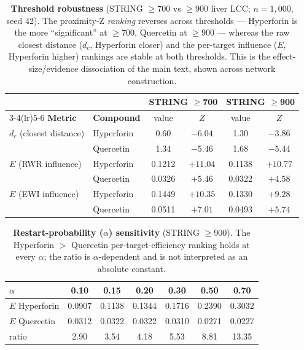 \begin{table}[ht]
\centering
\caption{\textbf{Threshold robustness} (STRING $\geq$700 vs $\geq$900 liver LCC; $n=1{,}000$, seed 42). The proximity-Z \emph{ranking} reverses across thresholds --- Hyperforin is the more ``significant'' at $\geq$700, Quercetin at $\geq$900 --- whereas the raw closest distance ($d_c$, Hyperforin closer) and the per-target influence ($E$, Hyperforin higher) rankings are stable at both thresholds. This is the effect-size/evidence dissociation of the main text, shown across network construction.}
\label{tab:s_threshold}
\begin{tabular}{@{}llcccc@{}}
\toprule
& & \multicolumn{2}{c}{\textbf{STRING $\geq$700}} & \multicolumn{2}{c}{\textbf{STRING $\geq$900}} \\
\cmidrule(lr){3-4}\cmidrule(lr){5-6}
\textbf{Metric} & \textbf{Compound} & value & $Z$ & value & $Z$ \\
\midrule
$d_c$ (closest distance) & Hyperforin & 0.60 & $-6.04$ & 1.30 & $-3.86$ \\
                         & Quercetin  & 1.34 & $-5.46$ & 1.68 & $-5.44$ \\
\addlinespace
$E$ (RWR influence)      & Hyperforin & 0.1212 & $+11.04$ & 0.1138 & $+10.77$ \\
                         & Quercetin  & 0.0326 & $+5.46$  & 0.0322 & $+4.58$ \\
\addlinespace
$E$ (EWI influence)      & Hyperforin & 0.1449 & $+10.35$ & 0.1330 & $+9.28$ \\
                         & Quercetin  & 0.0511 & $+7.01$  & 0.0493 & $+5.74$ \\
\bottomrule
\end{tabular}
\end{table}

\begin{table}[ht]
\centering
\caption{\textbf{Restart-probability ($\alpha$) sensitivity} (STRING $\geq$900). The Hyperforin $>$ Quercetin per-target-efficiency ranking holds at every $\alpha$; the ratio is $\alpha$-dependent and is not interpreted as an absolute constant.}
\label{tab:s_alpha}
\begin{tabular}{@{}lcccccc@{}}
\toprule
$\alpha$ & 0.10 & 0.15 & 0.20 & 0.30 & 0.50 & 0.70 \\
\midrule
$E$ Hyperforin & 0.0907 & 0.1138 & 0.1344 & 0.1716 & 0.2390 & 0.3032 \\
$E$ Quercetin  & 0.0312 & 0.0322 & 0.0322 & 0.0310 & 0.0271 & 0.0227 \\
ratio          & 2.90 & 3.54 & 4.18 & 5.53 & 8.81 & 13.35 \\
\bottomrule
\end{tabular}
\end{table}

